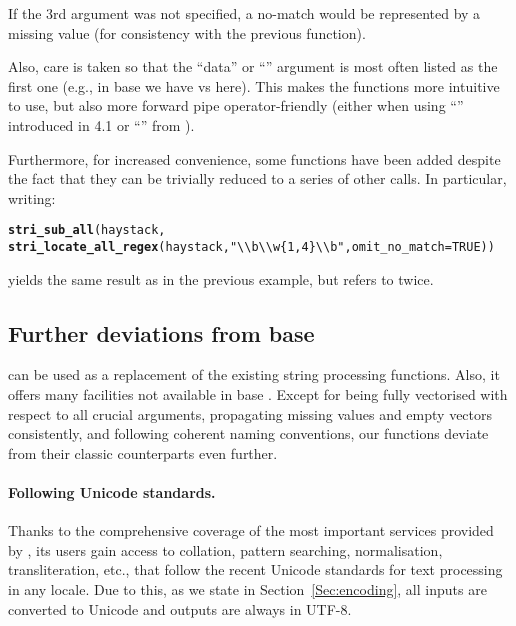 \documentclass[nojss]{jss}\usepackage[]{graphicx}\usepackage[]{xcolor}
\makeatletter
\newcommand{\hlnum}[1]{\textcolor[rgb]{0.686,0.059,0.569}{#1}}%
\newcommand{\hlstr}[1]{\textcolor[rgb]{0.192,0.494,0.8}{#1}}%
\newcommand{\hlstd}[1]{\textcolor[rgb]{0.345,0.345,0.345}{#1}}%
\newcommand{\hlkwc}[1]{\textcolor[rgb]{0.333,0.667,0.333}{#1}}%
\newcommand{\hlkwd}[1]{\textcolor[rgb]{0.737,0.353,0.396}{\textbf{#1}}}%
\newenvironment{kframe}{%
 \def\at@end@of@kframe{}%
 \ifinner\ifhmode%
  \def\at@end@of@kframe{\end{minipage}}%
  \begin{minipage}{\columnwidth}%
 \fi\fi%
 \def\FrameCommand##1{\hskip\@totalleftmargin \hskip-\fboxsep
 \colorbox{shadecolor}{##1}\hskip-\fboxsep
     \hskip-\linewidth \hskip-\@totalleftmargin \hskip\columnwidth}%
 \MakeFramed {\advance\hsize-\width
   \@totalleftmargin\z@ \linewidth\hsize
   \@setminipage}}%
 {\par\unskip\endMakeFramed%
 \at@end@of@kframe}
\newenvironment{knitrout}{}{} %
\makeatother
\begin{document}
If the 3rd argument was not specified, a no-match
would be represented by a missing value (for consistency with the
previous function).


Also, care is taken so that the ``data'' or ``''
argument is most often listed as the first one
(e.g., in base  we have 
vs  here).
This makes the functions more intuitive to use,
but also more forward pipe operator-friendly
(either when using ``\code{|>}'' introduced in  4.1
or ``\code{\%>\%}'' from ).


Furthermore, for increased convenience, some functions have been added
despite the fact that they can be trivially reduced to a series of
other calls.
In particular, writing:

\begin{knitrout}
\color{fgcolor}\begin{kframe}
\begin{alltt}
\hlkwd{stri_sub_all}\hlstd{(haystack,}
  \hlkwd{stri_locate_all_regex}\hlstd{(haystack,} \hlstr{"\textbackslash{}\textbackslash{}b\textbackslash{}\textbackslash{}w\{1,4\}\textbackslash{}\textbackslash{}b"}\hlstd{,} \hlkwc{omit_no_match}\hlstd{=}\hlnum{TRUE}\hlstd{))}
\end{alltt}
\end{kframe}
\end{knitrout}

\noindent
yields the same result as in the previous example,
but refers to  twice.


\subsection[Further deviations from base R]{Further deviations from base }

 can be used as a replacement of the existing string
processing functions. Also, it offers many
facilities not available in base .
Except for being fully vectorised with respect to all crucial
arguments, propagating missing values and empty vectors consistently,
and following coherent naming conventions, our functions
deviate from their classic counterparts even further.






\paragraph{Following Unicode standards.}
Thanks to the comprehensive coverage of the most important
services provided by , its users gain access to
collation, pattern searching, normalisation, transliteration, etc.,
that follow the recent Unicode standards for text processing
in any locale.
Due to this, as we state in Section~\ref{Sec:encoding},
all inputs are converted to Unicode and outputs are always
in UTF-8.
\end{document}
